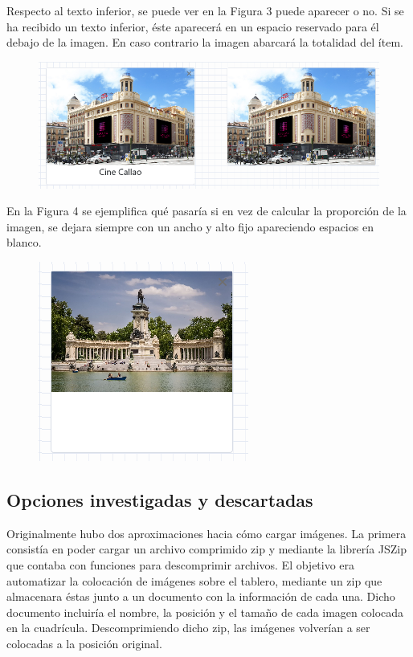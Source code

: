 Respecto al texto inferior, se puede ver en la Figura 3 puede aparecer o no. Si se ha recibido un texto inferior, éste aparecerá en un espacio reservado para él debajo de la imagen. En caso contrario la imagen abarcará la totalidad del ítem.

\begin{figure}[h!]
	\centering
	\includegraphics[width=0.7\linewidth]{Imagenes/Bitmap/photoItemTexto}
	\caption{}
	\label{fig:photoitemtexto}
\end{figure}


En la Figura 4 se ejemplifica qué pasaría si en vez de calcular la proporción de la imagen, se dejara siempre con un ancho y alto fijo apareciendo espacios en blanco.

\begin{figure}[h!]
	\centering
	\includegraphics[width=0.7\linewidth]{Imagenes/Bitmap/photoItemError}
	\caption{}
	\label{fig:photoitemerror}
\end{figure}


\subsection{Opciones investigadas y descartadas}

Originalmente hubo dos aproximaciones hacia cómo cargar imágenes. La primera consistía en poder cargar un archivo comprimido zip y mediante la librería JSZip que contaba con funciones para descomprimir archivos. El objetivo era automatizar la colocación de imágenes sobre el tablero, mediante un zip que almacenara éstas junto a un documento con la información de cada una. Dicho documento incluiría el nombre, la posición y el tamaño de cada imagen colocada en la cuadrícula. Descomprimiendo dicho zip, las imágenes volverían a ser colocadas a la posición original.

